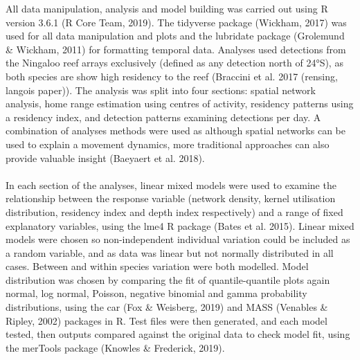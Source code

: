 \documentclass[11pt,a4paper]{article}
\begin{document}
	All data manipulation, analysis and model building was carried out using R version 3.6.1 (R Core Team, 2019). The tidyverse package (Wickham, 2017) was used for all data manipulation and plots and the lubridate package (Grolemund \& Wickham, 2011) for formatting temporal data. Analyses used detections from the Ningaloo reef arrays exclusively (defined as any detection north of 24°S), as both species are show high residency to the reef (Braccini et al. 2017 (rensing, langois paper)). The analysis was split into four sections: spatial network analysis, home range estimation using centres of activity, residency patterns using a residency index, and detection patterns examining detections per day. A combination of analyses methods were used as although spatial networks can be used to explain a movement dynamics, more traditional approaches can also provide valuable insight (Baeyaert et al. 2018). \\
	\\
	In each section of the analyses, linear mixed models were used to examine the relationship between the response variable (network density, kernel utilisation distribution, residency index and depth index respectively) and a range of fixed explanatory variables, using the lme4 R package (Bates et al. 2015). Linear mixed models were chosen so non-independent individual variation could be included as a random variable, and as data was linear but not normally distributed in all cases. Between and within species variation were both modelled. Model distribution was chosen by comparing the fit of quantile-quantile plots again normal, log normal, Poisson, negative binomial and gamma probability distributions, using the car (Fox \& Weisberg, 2019) and MASS (Venables \& Ripley, 2002) packages in R. Test files were then generated, and each model tested, then outputs compared against the original data to check model fit, using the merTools package (Knowles \& Frederick, 2019).\\
	\\
\end{document}
